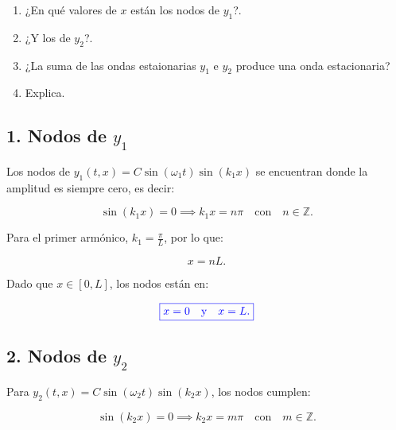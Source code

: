 \documentclass[a4paper,12pt]{article} %
\begin{document}
\begin{enumerate}
    \item ¿En qué valores de \(x\) están los nodos de \(y_1\)?.
    \item ¿Y los de \(y_2\)?.
    \item ¿La suma de las ondas estaionarias \(y_1\) e \(y_2\) produce una onda estacionaria?
    \item Explica.
\end{enumerate}

\newpage

\subsection*{1. Nodos de \( y_1 \)}

\vspace{\baselineskip}

\begin{justify}
    Los nodos de \( y_1(t, x) = C \sin(\omega_1 t) \sin(k_1 x) \) se encuentran donde la amplitud es siempre cero, es decir:
\end{justify}

\[ \sin(k_1 x) = 0 \implies k_1 x = n \pi \quad \text{con} \quad n \in \mathbb{Z}. \]

\begin{justify}
    Para el primer armónico, \( k_1 = \frac{\pi}{L} \), por lo que:
\end{justify}

\[ x = n L. \]

\begin{justify}
    Dado que \( x \in [0, L] \), los nodos están en:
\end{justify}

\[ \textcolor{blue}{\boxed{x = 0 \quad \text{y} \quad x = L.}}\]

\subsection{2. Nodos de \( y_2 \)}

\vspace{\baselineskip}

\begin{justify}
    Para \( y_2(t, x) = C \sin(\omega_2 t) \sin(k_2 x) \), los nodos cumplen:
\end{justify}

\[ \sin(k_2 x) = 0 \implies k_2 x = m \pi \quad \text{con} \quad m \in \mathbb{Z}. \]

\vspace{\baselineskip}
\end{document}
